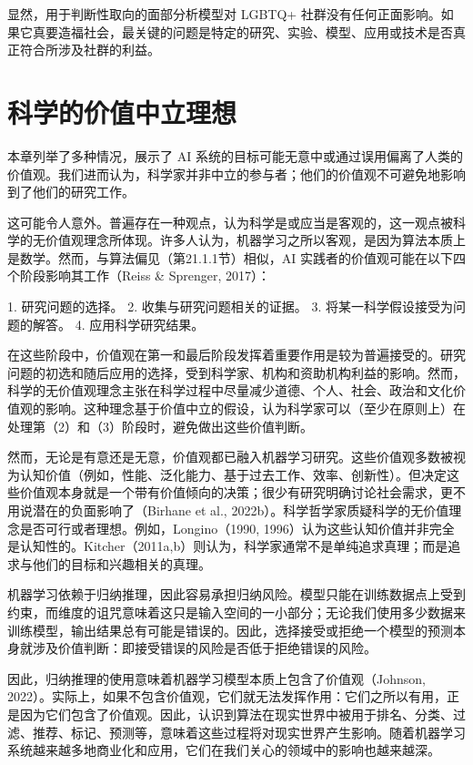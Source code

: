 \documentclass[lang=cn,newtx,10pt,scheme=chinese]{elegantbook}
\begin{document}
显然，用于判断性取向的面部分析模型对 LGBTQ+ 社群没有任何正面影响。如果它真要造福社会，最关键的问题是特定的研究、实验、模型、应用或技术是否真正符合所涉及社群的利益。

\section{科学的价值中立理想}
本章列举了多种情况，展示了 AI 系统的目标可能无意中或通过误用偏离了人类的价值观。我们进而认为，科学家并非中立的参与者；他们的价值观不可避免地影响到了他们的研究工作。

这可能令人意外。普遍存在一种观点，认为科学是或应当是客观的，这一观点被科学的无价值观理念所体现。许多人认为，机器学习之所以客观，是因为算法本质上是数学。然而，与算法偏见（第21.1.1节）相似，AI 实践者的价值观可能在以下四个阶段影响其工作（Reiss \& Sprenger, 2017）：

1. 研究问题的选择。
2. 收集与研究问题相关的证据。
3. 将某一科学假设接受为问题的解答。
4. 应用科学研究结果。

在这些阶段中，价值观在第一和最后阶段发挥着重要作用是较为普遍接受的。研究问题的初选和随后应用的选择，受到科学家、机构和资助机构利益的影响。然而，科学的无价值观理念主张在科学过程中尽量减少道德、个人、社会、政治和文化价值观的影响。这种理念基于价值中立的假设，认为科学家可以（至少在原则上）在处理第（2）和（3）阶段时，避免做出这些价值判断。

然而，无论是有意还是无意，价值观都已融入机器学习研究。这些价值观多数被视为认知价值（例如，性能、泛化能力、基于过去工作、效率、创新性）。但决定这些价值观本身就是一个带有价值倾向的决策；很少有研究明确讨论社会需求，更不用说潜在的负面影响了（Birhane et al., 2022b）。科学哲学家质疑科学的无价值理念是否可行或者理想。例如，Longino（1990, 1996）认为这些认知价值并非完全是认知性的。Kitcher（2011a,b）则认为，科学家通常不是单纯追求真理；而是追求与他们的目标和兴趣相关的真理。

机器学习依赖于归纳推理，因此容易承担归纳风险。模型只能在训练数据点上受到约束，而维度的诅咒意味着这只是输入空间的一小部分；无论我们使用多少数据来训练模型，输出结果总有可能是错误的。因此，选择接受或拒绝一个模型的预测本身就涉及价值判断：即接受错误的风险是否低于拒绝错误的风险。

因此，归纳推理的使用意味着机器学习模型本质上包含了价值观（Johnson, 2022）。实际上，如果不包含价值观，它们就无法发挥作用：它们之所以有用，正是因为它们包含了价值观。因此，认识到算法在现实世界中被用于排名、分类、过滤、推荐、标记、预测等，意味着这些过程将对现实世界产生影响。随着机器学习系统越来越多地商业化和应用，它们在我们关心的领域中的影响也越来越深。
\end{document}
